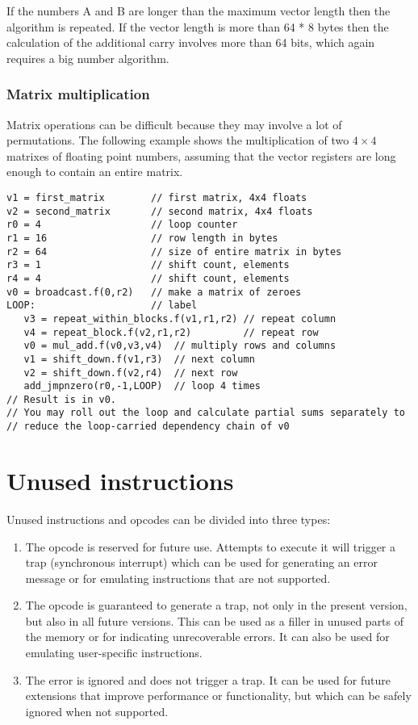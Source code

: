 \documentclass[forwardcom.tex]{subfiles}
\begin{document}
If the numbers A and B are longer than the maximum vector length then the algorithm is repeated. If the vector length is more than 64 * 8 bytes then the calculation of the additional carry involves more than 64 bits, which again requires a big number algorithm.

\subsubsection{Matrix multiplication} \label{matrixMultiplication}
Matrix operations can be difficult because they may involve a lot of permutations. The following example shows the multiplication of two $4\times4$ matrixes of floating point numbers, assuming that the vector registers are long enough to contain an entire matrix.

\vspace{2mm}

\begin{lstlisting}[frame=none]
v1 = first_matrix        // first matrix, 4x4 floats
v2 = second_matrix       // second matrix, 4x4 floats
r0 = 4                   // loop counter
r1 = 16                  // row length in bytes
r2 = 64                  // size of entire matrix in bytes
r3 = 1                   // shift count, elements
r4 = 4                   // shift count, elements
v0 = broadcast.f(0,r2)   // make a matrix of zeroes
LOOP:                    // label
   v3 = repeat_within_blocks.f(v1,r1,r2) // repeat column
   v4 = repeat_block.f(v2,r1,r2)         // repeat row
   v0 = mul_add.f(v0,v3,v4)  // multiply rows and columns
   v1 = shift_down.f(v1,r3)  // next column
   v2 = shift_down.f(v2,r4)  // next row
   add_jmpnzero(r0,-1,LOOP)  // loop 4 times
// Result is in v0.
// You may roll out the loop and calculate partial sums separately to
// reduce the loop-carried dependency chain of v0
\end{lstlisting}
\vspace{2mm}


\section{Unused instructions} \label{unusedInstructions}
Unused instructions and opcodes can be divided into three types:

\begin{enumerate}
\item The opcode is reserved for future use. Attempts to execute it will trigger a trap (synchronous interrupt) which can be used for generating an error message or for emulating instructions that are not supported.
\item The opcode is guaranteed to generate a trap, not only in the present version, but also in all future versions. This can be used as a filler in unused parts of the memory or for indicating unrecoverable errors. It can also be used for emulating user-specific instructions.
\item The error is ignored and does not trigger a trap. It can be used for future extensions that improve performance or functionality, but which can be safely ignored when not supported.
\end{enumerate}
\end{document}
